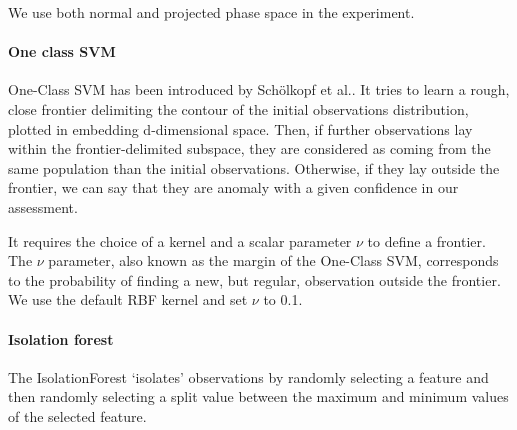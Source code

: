 We use both normal and projected phase space in the experiment. 


\paragraph*{\textbf{One class SVM}}
One-Class SVM has been introduced by Schölkopf et al.\cite{one_svm}.
It tries to learn a rough, close frontier delimiting the contour of the initial observations distribution, plotted in embedding d-dimensional space. Then, if further observations lay within the frontier-delimited subspace, they are considered as coming from the same population than the initial observations. Otherwise, if they lay outside the frontier, we can say that they are anomaly with a given confidence in our assessment.

 It requires the choice of a kernel and a scalar parameter $\nu$ to define a frontier.  The $\nu$ parameter, also known as the margin of the One-Class SVM, corresponds to the probability of finding a new, but regular, observation outside the frontier. We use the default RBF kernel and set $\nu$ to 0.1.


\paragraph*{\textbf{Isolation forest}}
The IsolationForest \cite{isolation} ‘isolates’ observations by randomly selecting a feature and then randomly selecting a split value between the maximum and minimum values of the selected feature.

